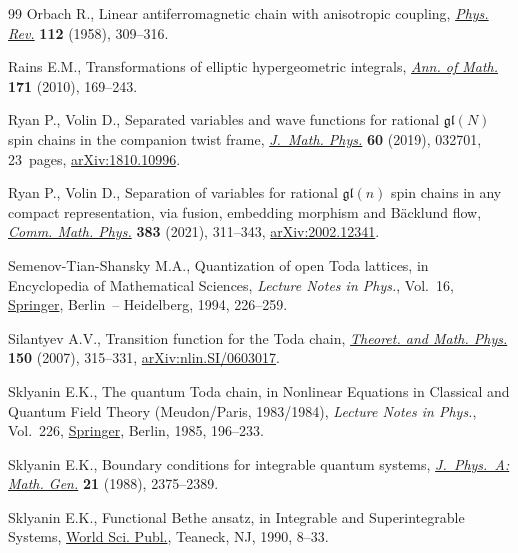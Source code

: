 \documentclass[pdftex]{sigma}%
\numberwithin{equation}{section}
\begin{document}
\begin{thebibliography}{99}
Orbach R., Linear antiferromagnetic chain with anisotropic coupling,
 \href{https://doi.org/10.1103/PhysRev.112.309}{\textit{Phys. Rev.}} \textbf{112} (1958), 309--316.

Rains E.M., Transformations of elliptic hypergeometric integrals, \href{https://doi.org/10.4007/annals.2010.171.169}{\textit{Ann.
 of Math.}} \textbf{171} (2010), 169--243.

Ryan P., Volin D., Separated variables and wave functions for rational
 {$\mathfrak{gl}(N)$} spin chains in the companion twist frame,
 \href{https://doi.org/10.1063/1.5085387}{\textit{J.~Math. Phys.}} \textbf{60} (2019), 032701, 23~pages,
 \href{https://arxiv.org/abs/1810.10996}{arXiv:1810.10996}.

Ryan P., Volin D., Separation of variables for rational {$\mathfrak{gl}(n)$}
 spin chains in any compact representation, via fusion, embedding morphism and
 {B}\"acklund flow, \href{https://doi.org/10.1007/s00220-021-03990-7}{\textit{Comm. Math. Phys.}} \textbf{383} (2021), 311--343,
 \href{https://arxiv.org/abs/2002.12341}{arXiv:2002.12341}.

Semenov-Tian-Shansky M.A., Quantization of open {T}oda lattices, in
 Encyclopedia of Mathematical Sciences, \textit{Lecture Notes in Phys.},
 Vol.~16, \href{https://doi.org/10.1007/978-3-662-06796-3_8}{Springer}, Berlin~-- Heidelberg, 1994, 226--259.

Silantyev A.V., Transition function for the {T}oda chain, \href{https://doi.org/10.1007/s11232-007-0024-1}{\textit{Theoret. and
 Math. Phys.}} \textbf{150} (2007), 315--331, \href{https://arxiv.org/abs/nlin.SI/0603017}{arXiv:nlin.SI/0603017}.

Sklyanin E.K., The quantum {T}oda chain, in Nonlinear Equations in Classical
 and Quantum Field Theory ({M}eudon/{P}aris, 1983/1984), \textit{Lecture Notes
 in Phys.}, Vol.~226, \href{https://doi.org/10.1007/3-540-15213-X_80}{Springer}, Berlin, 1985, 196--233.

Sklyanin E.K., Boundary conditions for integrable quantum systems,
 \href{https://doi.org/10.1088/0305-4470/21/10/015}{\textit{J.~Phys.~A: Math. Gen.}} \textbf{21} (1988), 2375--2389.

Sklyanin E.K., Functional {B}ethe ansatz, in Integrable and Superintegrable
 Systems, \href{https://doi.org/10.1142/9789812797179_0002}{World Sci. Publ.}, Teaneck, NJ, 1990, 8--33.


\end{thebibliography}
\end{document}
